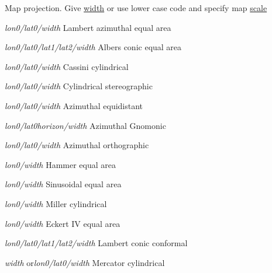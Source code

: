 \documentclass{article}
\begin{document}
\par {} Map projection.  Give \underline{width} or use lower case code and specify map \underline{scale}\par 

\par 	{}\emph{lon0/lat0/width}	Lambert azimuthal equal area\par 

\par 	{}\emph{lon0/lat0/lat1/lat2/width}	Albers conic equal area\par 

\par 	{}\emph{lon0/lat0/width}	Cassini cylindrical\par 

\par 	{}\emph{lon0/lat0/width}	Cylindrical stereographic\par 

\par 	{}\emph{lon0/lat0/width}	Azimuthal equidistant\par 

\par 	{}\emph{lon0/lat0horizon/width}	Azimuthal Gnomonic\par 

\par 	{}\emph{lon0/lat0/width}	Azimuthal orthographic\par 

\par 	{}\emph{lon0/width}	Hammer equal area\par 

\par 	{}\emph{lon0/width}	Sinusoidal equal area\par 

\par 	{}\emph{lon0/width}	Miller cylindrical\par 

\par 	{}\emph{lon0/width}	Eckert IV equal area\par 

\par 	{}\emph{lon0/lat0/lat1/lat2/width}	Lambert conic conformal\par 

\par 	{}\emph{width }or\emph{}\emph{lon0/lat0/width}	Mercator cylindrical\par 
\end{document}
